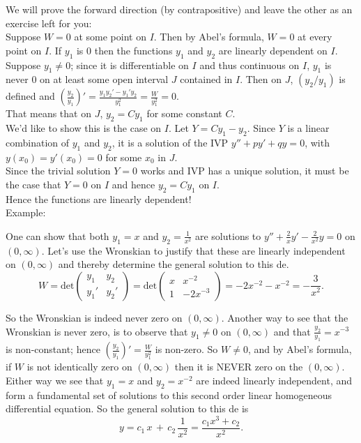 \documentclass{ximera}
\begin{document}
  We will prove the forward direction (by contrapositive) and leave the other as an exercise left for you:  \\

  Suppose $W=0$ at some point on $I$.  Then by Abel's formula, $W=0$ at every point on $I$.  If $y_1$ is $0$ then the functions $y_1$ and $y_2$ are linearly dependent on $I$.  Suppose $y_1\neq 0$;  since it is differentiable on $I$ and thus continuous on $I$, $y_1$ is never $0$ on at least some open interval $J$ contained in $I$.   Then on $J$, $(y_{2}/y_{1})$ is defined  and
  $\displaystyle \left(\frac{y_{2}}{y_{1}}\right)'=\frac{y_{1}y_{2}'-y_{1}'y_{2}}{y_{1}^{2}}=\frac{W}{y_{1}^{2}}=0$.\\

  That means that on $J$, $y_2=Cy_1$ for some constant $C$.\\

  We'd like to show this is the case on $I$.  Let $Y=Cy_{1}-y_{2}$.  Since $Y$ is a linear combination of $y_{1}$ and $y_{2}$, it is a solution of the IVP $y''+py'+qy=0$, with $y(x_{0})=y'(x_{0})=0$  for some $x_{0}$ in $J$.\\


 Since the trivial solution $Y=0$ works and IVP has a unique solution, it must be the case that $Y=0$ on $I$ and hence $y_{2}=Cy_{1}$ on $I$.\\

 Hence the functions are linearly dependent!\\
 
 

 Example:
 
 One can show that both $y_1=x$ and $\displaystyle y_2=\frac{1}{x^2}$ are solutions to $\displaystyle y''+\frac{2}{x}y'-\frac{2}{x^2}y=0$ on $(0,\infty)$.  Let's use the Wronskian to justify that these are linearly independent on $(0,\infty)$ and thereby determine the general solution to this de.\\
 
 
 \[W=\mathrm{det}\left( \begin{array}{cc}
 y_{1} & y_{2}\\
 y_{1}' & y_{2}'  \end{array}\right)=\mathrm{det}\left( \begin{array}{cc}
 x & x^{-2}\\
 1 & -2x^{-3} \end{array}\right)=-2x^{-2}-x^{-2}=-\frac{3}{x^2}.\]

 So the Wronskian is indeed never zero on $(0,\infty)$.  Another way to see that the Wronskian is never zero, is to observe that $y_1\neq 0$ on $(0,\infty)$ and that $\frac{y_2}{y_1}=x^{-3}$ is non-constant; hence $\displaystyle \left(\frac{y_2}{y_1}\right)'=\frac{W}{y_1^2}$ is non-zero.  So $W\neq 0$, and by Abel's formula, if $W$ is not identically zero on $(0,\infty)$ then it is NEVER zero on the $(0,\infty)$.\\


 Either way we see that $y_1=x$ and $y_2=x^{-2}$ are indeed linearly independent, and form a fundamental set of solutions to this second order linear homogeneous differential equation.  So the general solution to this de is $$y=c_1\,x\,+\,c_2\,\frac{1}{x^2}=\frac{c_1 x^3+c_2}{x^2}.$$
\end{document}
